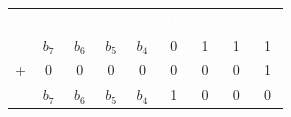 \begin{tabular}{ccccccccc}\rowcolor{DEplava}&\textcolor{white}{$D_7$}&\textcolor{white}{$D_6$}&\textcolor{white}{$D_5$}&\textcolor{white}{$D_4$}&\textcolor{white}{$D_3$}&\textcolor{white}{$D_2$}&\textcolor{white}{$D_1$}&\textcolor{white}{$D_0$}\\
\rowcolor{DEplava!12}&$b_7$&$b_6$&$b_5$&$b_4$&\textcolor{DEcrvena}{0}&1&1&1\\
\rowcolor{DEplava!7}+&0&0&0&0&\textcolor{DEcrvena}{0}&0&0&1\\
\rowcolor{DEplava!12}&$b_7$&$b_6$&$b_5$&$b_4$&\textcolor{DEcrvena}{1}&0&0&0\\
\end{tabular}